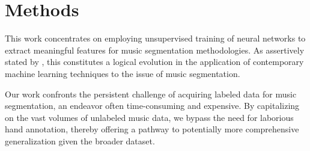 \chapter{Methods}

This work concentrates on employing unsupervised training of neural networks to extract meaningful features for music segmentation methodologies. As assertively stated by \cite{deepfeaturesegment}, this constitutes a logical evolution in the application of contemporary machine learning techniques to the issue of music segmentation.

Our work confronts the persistent challenge of acquiring labeled data for music segmentation, an endeavor often time-consuming and expensive. By capitalizing on the vast volumes of unlabeled music data, we bypass the need for laborious hand annotation, thereby offering a pathway to potentially more comprehensive generalization given the broader dataset.




\newpage



